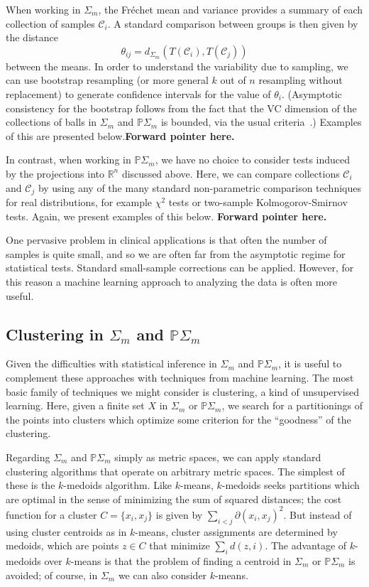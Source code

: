 \documentclass[a4paper,11pt]{article}
\newcommand{\aC}{\mathcal{C}}
\begin{document}
When working in $\Sigma_m$, the Fr\'echet mean and variance provides a summary of each collection of samples $\aC_i$.
A standard comparison between groups is then given by the distance 
\[
\theta_{ij} = d_{\Sigma_m}(T(\aC_i), T(\aC_j))
\]
between the means.
In order to understand the variability due to sampling, we can use bootstrap resampling (or more general $k$ out of $n$ resampling without replacement) to generate confidence intervals for the value of $\theta_i$.
(Asymptotic consistency for the bootstrap follows from the fact that the VC dimension of the collections of balls in $\Sigma_m$ and $\mathbb{P}\Sigma_m$ is bounded, via the usual criteria~\cite{Gine1984, Gine1986, Gine1990}.) 
Examples of this are presented below.{\bf Forward pointer here.}

In contrast, when working in $\mathbb{P}\Sigma_m$, we have no choice to consider tests induced by the projections into $\mathbb{R}^n$ discussed above.
Here, we can compare collections $\aC_i$ and $\aC_j$ by using any of the many standard non-parametric comparison techniques for real distributions, for example $\chi^2$ tests or two-sample Kolmogorov-Smirnov tests.
Again, we present examples of this below.  {\bf Forward pointer here.}

One pervasive problem in clinical applications is that often the number of samples is quite small, and so we are often far from the asymptotic regime for statistical tests.
Standard small-sample corrections can be applied.
However, for this reason a machine learning approach to analyzing the data is often more useful.

\subsection{Clustering in $\Sigma_m$ and $\mathbb{P}\Sigma_m$}

Given the difficulties with statistical inference in $\Sigma_m$ and $\mathbb{P}\Sigma_m$, it is useful to complement these approaches with techniques from machine learning.
The most basic family of techniques we might consider is clustering, a kind of unsupervised learning.
Here, given a finite set $X$ in $\Sigma_m$ or $\mathbb{P}\Sigma_m$, we search for a partitionings of the points into clusters which optimize some criterion for the ``goodness'' of the clustering.

Regarding $\Sigma_m$ and $\mathbb{P}\Sigma_m$ simply as metric spaces, we can apply standard clustering algorithms that operate on arbitrary metric spaces.  
The simplest of these is the $k$-medoids algorithm.
Like $k$-means, $k$-medoids seeks partitions which are optimal in the sense of minimizing the sum of squared distances; the cost function for a cluster $C = \{x_i, x_j\}$ is given by $\sum_{i < j} \partial(x_i,x_j)^2$.
But instead of using cluster centroids as in $k$-means, cluster assignments are determined by medoids, which are points $z \in C$ that minimize $\sum_i d(z,i)$.
The advantage of $k$-medoids over $k$-means is that the problem of finding a centroid in $\Sigma_m$ or $\mathbb{P}\Sigma_m$ is avoided; of course, in $\Sigma_m$ we can also consider $k$-means.
\end{document}
